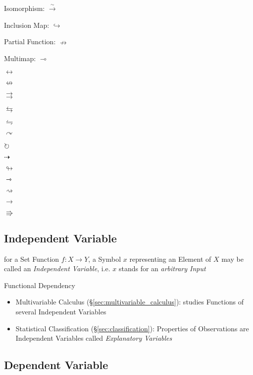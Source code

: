 Isomorphism: $\xrightarrow{\sim}$

Inclusion Map: $\hookrightarrow$

Partial Function: $\nrightarrow$

Multimap: $\multimap$

$\leftrightarrow$

$\nleftrightarrow$

$\rightrightarrows$

$\leftrightarrows$

$\leftrightharpoons$

$\curvearrowright$

$\circlearrowright$

$\dashrightarrow$

$\looparrowright$

$\rightarrowtriangle$

$\rightsquigarrow$

$\to$

$\Rrightarrow$



\subsection{Independent Variable}\label{sec:independent_variable}

for a Set Function $f : X \to Y$, a Symbol $x$ representing an Element
of $X$ may be called an \emph{Independent Variable}, i.e. $x$ stands for an
\emph{arbitrary Input}

Functional Dependency %

\begin{itemize}
  \item Multivariable Calculus (\S\ref{sec:multivariable_calculus}): studies
    Functions of several Independent Variables
  \item Statistical Classification (\S\ref{sec:classification}): Properties of
    Observations are Independent Variables called \emph{Explanatory Variables}
\end{itemize}



\subsection{Dependent Variable}\label{sec:dependent_variable}

